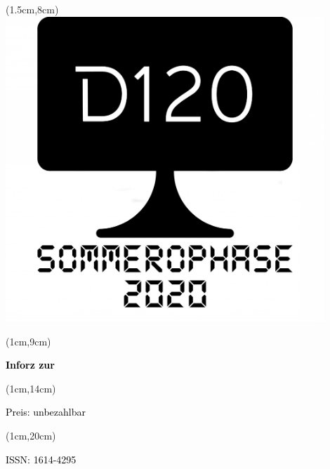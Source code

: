 \begin{titlepage}
\begin{textblock*}{18cm}(1.5cm,8cm)
	\includegraphics[width=12cm]{../grafik/oinforz_cover_ss20}
\end{textblock*}

\begin{textblock*}{5cm}(1cm,9cm)
\begin{rotate}{90}
\sffamily\huge\textbf{
	\textcolor{black}{Inforz zur \ophase}}
\end{rotate}
\end{textblock*}


\begin{textblock*}{2cm}(1cm,14cm)
\begin{rotate}{90}
\sffamily\small \textcolor{black}{Preis: unbezahlbar}
\end{rotate}
\end{textblock*}


\begin{textblock*}{2cm}(1cm,20cm)
\begin{rotate}{90}
\sffamily \textcolor{black}{ISSN: 1614-4295}
\end{rotate}
\end{textblock*}

\end{titlepage}
\newpage
